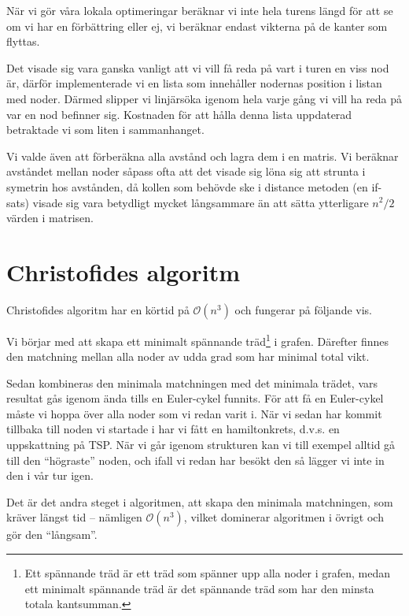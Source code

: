 \documentclass[a4paper,12pt]{article}
\renewcommand{\O}{\ensuremath{\mathcal{O}}}
\renewcommand{\*}{\ensuremath{\cdot}}
\begin{document}
När vi gör våra lokala optimeringar beräknar vi inte hela turens längd för att
se om vi har en förbättring eller ej, vi beräknar endast vikterna på de kanter
som flyttas.

Det visade sig vara ganska vanligt att vi vill få reda på vart i turen en viss
nod är, därför implementerade vi en lista som innehåller nodernas position i
listan med noder. Därmed slipper vi linjärsöka igenom hela varje gång vi vill ha
reda på var en nod befinner sig. Kostnaden för att hålla denna lista uppdaterad
betraktade vi som liten i sammanhanget.

Vi valde även att förberäkna alla avstånd och lagra dem i en matris. Vi beräknar
avståndet mellan noder såpass ofta att det visade sig löna sig att strunta i
symetrin hos avstånden, då kollen som behövde ske i distance metoden (en
if-sats) visade sig vara betydligt mycket långsammare än att sätta ytterligare
$n^2/2$ värden i matrisen.



\section{Christofides algoritm} 

Christofides algoritm har en körtid på $\O(n^3)$ och fungerar på följande vis.

Vi börjar med att skapa ett minimalt spännande träd\footnote{Ett spännande träd
är ett träd som spänner upp alla noder i grafen, medan ett minimalt spännande
träd är det spännande träd som har den minsta totala kantsumman.} i grafen.
Därefter finnes den matchning mellan alla noder av udda grad som har minimal 
total vikt.  

Sedan kombineras den minimala matchningen med det minimala trädet, vars resultat
gås igenom ända tills en Euler-cykel funnits. För att få en Euler-cykel måste vi
hoppa över alla noder som vi redan varit i. När vi sedan har kommit tillbaka
till noden vi startade i har vi fått en hamiltonkrets, d.v.s. en uppskattning på
TSP.  När vi går igenom strukturen kan vi till exempel alltid gå till den
``högraste'' noden, och ifall vi redan har besökt den så lägger vi inte in den i
vår tur igen.

Det är det andra steget i algoritmen, att skapa den minimala matchningen, som
kräver längst tid -- nämligen $\O(n^3)$, vilket dominerar algoritmen i övrigt och
gör den ``långsam''.
\end{document}
